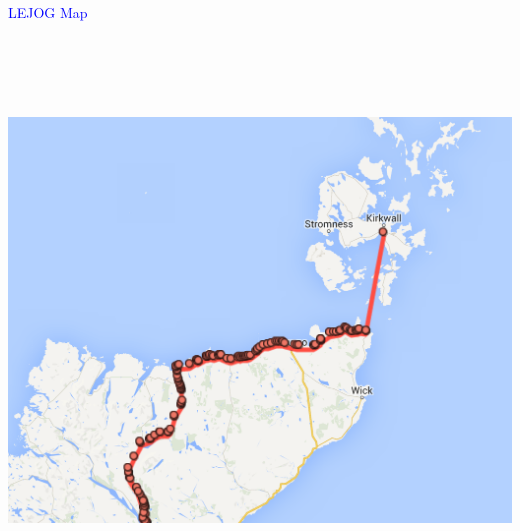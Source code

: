 \documentclass[landscape]{slides}
\begin{document}
\begin{slide}

    \textcolor{blue}{\Large{LEJOG Map}}

    \begin{center}
        \includegraphics[height=15cm]{lejog-screwed}
    \end{center}

\end{slide}
\end{document}
